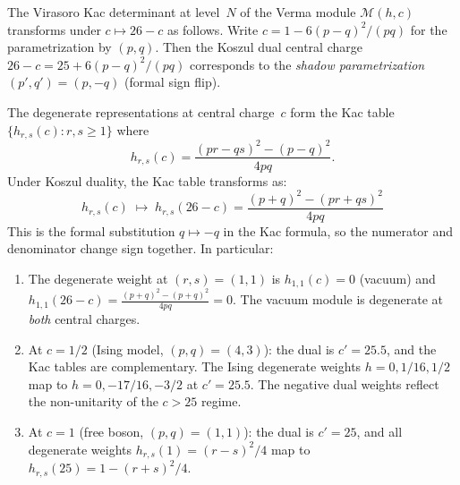 \begin{proposition}
\label{prop:virasoro-kac-koszul}
The Virasoro Kac determinant at level~$N$ of the Verma module
$\mathcal{M}(h, c)$ transforms under $c \mapsto 26-c$ as follows.
Write $c = 1 - 6(p - q)^2/(pq)$ for the parametrization by
$(p, q)$.  Then the Koszul dual central charge $26 - c = 25 + 6(p-q)^2/(pq)$
corresponds to the \emph{shadow parametrization}
$(p', q') = (p, -q)$ \textup{(}formal sign flip\textup{)}.

The degenerate representations at central charge~$c$ form the
Kac table $\{h_{r,s}(c) : r, s \geq 1\}$ where
\begin{equation}\label{eq:kac-hrs}
h_{r,s}(c) = \frac{(pr - qs)^2 - (p - q)^2}{4pq}.
\end{equation}
Under Koszul duality, the Kac table transforms as:
\begin{equation}\label{eq:kac-table-koszul}
h_{r,s}(c) \;\longmapsto\; h_{r,s}(26-c)
= \frac{(p + q)^2 - (pr + qs)^2}{4pq}
\end{equation}
This is the formal substitution $q \mapsto -q$ in the Kac formula,
so the numerator and denominator change sign together.  In particular:
\begin{enumerate}[label=\textup{(\roman*)}]
\item The degenerate weight at $(r,s) = (1,1)$ is
  $h_{1,1}(c) = 0$ \textup{(}vacuum\textup{)} and
  $h_{1,1}(26-c) = \frac{(p+q)^2 - (p+q)^2}{4pq} = 0$.
  The vacuum module is degenerate at \emph{both} central charges.

\item At $c = 1/2$ \textup{(}Ising model, $(p,q) = (4,3)$\textup{)}:
  the dual is $c' = 25.5$, and the Kac tables are complementary.
  The Ising degenerate weights $h = 0, 1/16, 1/2$ map to
  $h = 0, -17/16, -3/2$ at $c' = 25.5$.
  The negative dual weights reflect the non-unitarity of the $c > 25$ regime.

\item At $c = 1$ \textup{(}free boson, $(p,q) = (1,1)$\textup{)}:
  the dual is $c' = 25$, and all degenerate weights
  $h_{r,s}(1) = (r-s)^2/4$ map to $h_{r,s}(25) = 1 - (r+s)^2/4$.
\end{enumerate}
\end{proposition}

